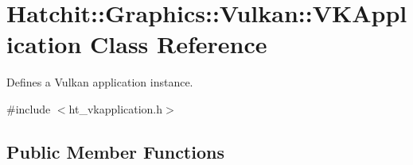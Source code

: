 \hypertarget{classHatchit_1_1Graphics_1_1Vulkan_1_1VKApplication}{}\section{Hatchit\+:\+:Graphics\+:\+:Vulkan\+:\+:V\+K\+Application Class Reference}
\label{classHatchit_1_1Graphics_1_1Vulkan_1_1VKApplication}


Defines a Vulkan application instance.  




{\ttfamily \#include $<$ht\+\_\+vkapplication.\+h$>$}

\subsection*{Public Member Functions}
